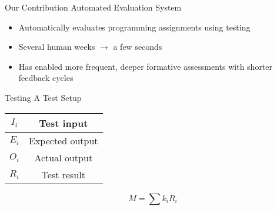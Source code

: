 \documentclass{beamer}
\begin{document}
\begin{frame}{Our Contribution}
{Automated Evaluation System}

\begin{itemize}
\item Automatically evaluates programming assignments using testing
\item Several human weeks $\longrightarrow$ a few seconds
\item Has enabled more frequent, deeper formative assessments with shorter feedback cycles
\end{itemize}
\end{frame}

\begin{frame}{Testing}
{A Test Setup}

\begin{center}

\begin{multicols}{2}
\begin{tabular}{| c | c |}
\hline
$I_i$ & Test input \\
\hline
$E_i$ & Expected output \\
\hline
$O_i$ & Actual output \\
\hline
$R_i$ & Test result \\
\hline
\end{tabular}

\begin{equation*}
M = \sum k_i R_i
\end{equation*}
\end{multicols}
\end{center}

\end{frame}
\end{document}
